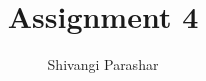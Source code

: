 \documentclass[journal,12pt,twocolumn]{IEEEtran}
\begin{document}
\makeatletter
{}
\makeatother
\let\StandardTheFigure\thefigure
\let\vec\mathbf
\renewcommand{\thefigure}{\theproblem}
\def\putbox#1#2#3{\makebox[0in][l]{\makebox[#1][l]{}\raisebox{\baselineskip}[0in][0in]{\raisebox{#2}[0in][0in]{#3}}}}
     \def\rightbox#1{\makebox[0in][r]{#1}}
     \def\centbox#1{\makebox[0in]{#1}}
     \def\topbox#1{\raisebox{-\baselineskip}[0in][0in]{#1}}
     \def\midbox#1{\raisebox{-0.5\baselineskip}[0in][0in]{#1}}
\vspace{3cm}
\title{Assignment 4}
\author{Shivangi Parashar}
%
%
%
%
%
\end{document}
